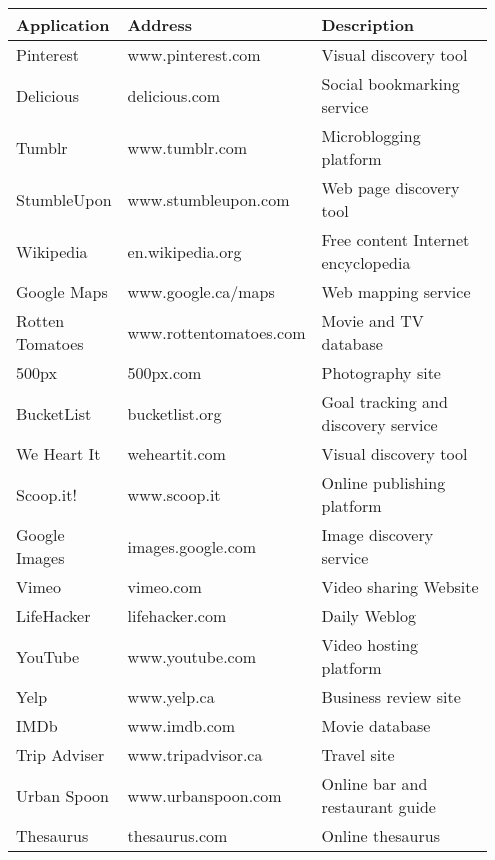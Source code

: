 {\begin{table*}[htbp]
\begin{tabular}{|p{0.20\linewidth}| p{0.30\linewidth}| p{0.45\linewidth}|}
\hline
Application     & Address                                                                  & Description                                                                                                                                                                                                                                                                                            
\\
\hline
Pinterest       & www.pinterest.com & Visual discovery tool \\
\hline
Delicious       & delicious.com & Social bookmarking service \\
\hline
Tumblr          & www.tumblr.com & Microblogging platform \\
\hline
StumbleUpon     & www.stumbleupon.com  & Web page discovery tool \\
\hline
Wikipedia       & en.wikipedia.org   & Free content Internet encyclopedia\\
\hline
Google Maps     & www.google.ca/maps  & Web mapping service\\
\hline
Rotten Tomatoes & www.rottentomatoes.com & Movie and TV database\\
\hline
500px           & 500px.com            & Photography site\\
\hline
BucketList      & bucketlist.org  & Goal tracking and discovery service\\
\hline
We Heart It     & weheartit.com & Visual discovery tool \\
\hline
Scoop.it!       & www.scoop.it & Online publishing platform \\
\hline
Google Images   & images.google.com  &Image discovery service \\
\hline
Vimeo           & vimeo.com  & Video sharing Website\\
\hline
LifeHacker      & lifehacker.com                                    & Daily Weblog \\
\hline
YouTube         & www.youtube.com 	& Video hosting platform \\
\hline
Yelp            & www.yelp.ca  & Business review site\\
\hline
IMDb            & www.imdb.com  & Movie database \\
\hline
Trip Adviser    & www.tripadvisor.ca & Travel site \\
\hline
Urban Spoon     & www.urbanspoon.com             & Online bar and restaurant guide\\
\hline
Thesaurus       & thesaurus.com                                 & Online thesaurus \\
\hline
\end{tabular}
\end{table*}

} %

